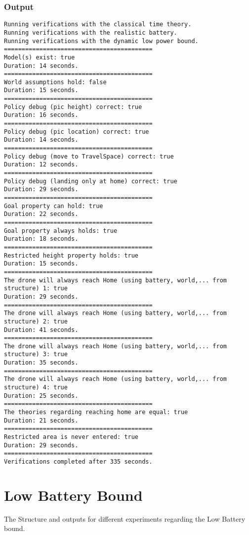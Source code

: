\documentclass[12pt]{extarticle}
\begin{document}
\subsubsection*{Output}
\begin{lstlisting}[basicstyle=\tiny]
Running verifications with the classical time theory.
Running verifications with the realistic battery.
Running verifications with the dynamic low power bound.
==========================================
Model(s) exist: true
Duration: 14 seconds.
==========================================
World assumptions hold: false
Duration: 15 seconds.
==========================================
Policy debug (pic height) correct: true
Duration: 16 seconds.
==========================================
Policy debug (pic location) correct: true
Duration: 14 seconds.
==========================================
Policy debug (move to TravelSpace) correct: true
Duration: 12 seconds.
==========================================
Policy debug (landing only at home) correct: true
Duration: 29 seconds.
==========================================
Goal property can hold: true
Duration: 22 seconds.
==========================================
Goal property always holds: true
Duration: 18 seconds.
==========================================
Restricted height property holds: true
Duration: 15 seconds.
==========================================
The drone will always reach Home (using battery, world,... from structure) 1: true
Duration: 29 seconds.
==========================================
The drone will always reach Home (using battery, world,... from structure) 2: true
Duration: 41 seconds.
==========================================
The drone will always reach Home (using battery, world,... from structure) 3: true
Duration: 35 seconds.
==========================================
The drone will always reach Home (using battery, world,... from structure) 4: true
Duration: 25 seconds.
==========================================
The theories regarding reaching home are equal: true
Duration: 21 seconds.
==========================================
Restricted area is never entered: true
Duration: 29 seconds.
==========================================
Verifications completed after 335 seconds.
\end{lstlisting}

\section{Low Battery Bound}
\label{app:lowbatterybound}
The Structure and outputs for different experiments regarding the Low Battery bound.
\end{document}
